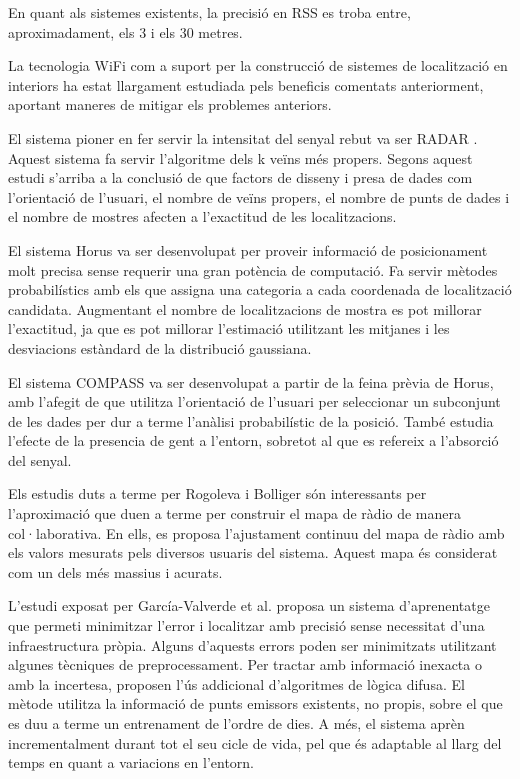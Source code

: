 En quant als sistemes existents, la precisió en RSS es troba entre, aproximadament, els 3 i els 30 metres.

La tecnologia WiFi com a suport per la construcció de sistemes de localització en interiors ha estat llargament estudiada pels beneficis comentats anteriorment, aportant maneres de mitigar els problemes anteriors.

El sistema pioner en fer servir la intensitat del senyal rebut va ser RADAR \cite{bahl}. Aquest sistema fa servir l'algoritme dels k veïns més propers. Segons aquest estudi s'arriba a la conclusió de que factors de disseny i presa de dades com l'orientació de l'usuari, el nombre de veïns propers, el nombre de punts de dades i el nombre de mostres afecten a l'exactitud de les localitzacions.

El sistema Horus \cite{youssef} va ser desenvolupat per proveir informació de posicionament molt precisa sense requerir una gran potència de computació. Fa servir mètodes probabilístics amb els que assigna una categoria a cada coordenada de localització candidata. Augmentant el nombre de localitzacions de mostra es pot millorar l'exactitud, ja que es pot millorar l'estimació utilitzant les mitjanes i les desviacions estàndard de la distribució gaussiana.

El sistema COMPASS \cite{king} va ser desenvolupat a partir de la feina prèvia de Horus, amb l’afegit de que utilitza l'orientació de l’usuari per seleccionar un subconjunt de les dades per dur a terme l’anàlisi probabilístic de la posició. També estudia l’efecte de la presencia de gent a l’entorn, sobretot al que es refereix a l’absorció del senyal.

Els estudis duts a terme per Rogoleva \cite{rogoleva} i Bolliger \cite{bolliger} són interessants per l’aproximació que duen a terme per construir el mapa de ràdio de manera col·laborativa. En ells, es proposa l’ajustament continuu del mapa de ràdio amb els valors mesurats pels diversos usuaris del sistema. Aquest mapa és considerat com un dels més massius i acurats.

L'estudi exposat per García-Valverde et al. \cite{garcia} proposa un sistema d'aprenentatge que permeti minimitzar l'error i localitzar amb precisió sense necessitat d'una infraestructura pròpia. Alguns d'aquests errors poden ser minimitzats utilitzant algunes tècniques de preprocessament.  Per tractar amb informació inexacta o amb la incertesa, proposen l'ús addicional d'algoritmes de lògica difusa. El mètode utilitza la informació de punts emissors existents, no propis, sobre el que es duu a terme un entrenament de l'ordre de dies. A més, el sistema aprèn incrementalment durant tot el seu cicle de vida, pel que és adaptable al llarg del temps en quant a variacions en l’entorn.

